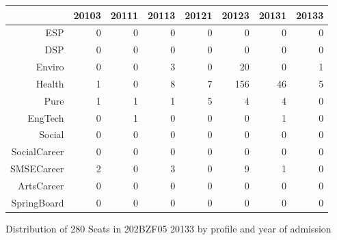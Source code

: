 \documentclass{article}\usepackage[]{graphicx}\usepackage[]{color}
\makeatletter
\newenvironment{kframe}{%
 \def\at@end@of@kframe{}%
 \ifinner\ifhmode%
  \def\at@end@of@kframe{\end{minipage}}%
  \begin{minipage}{\columnwidth}%
 \fi\fi%
 \def\FrameCommand##1{\hskip\@totalleftmargin \hskip-\fboxsep
 \colorbox{shadecolor}{##1}\hskip-\fboxsep
     \hskip-\linewidth \hskip-\@totalleftmargin \hskip\columnwidth}%
 \MakeFramed {\advance\hsize-\width
   \@totalleftmargin\z@ \linewidth\hsize
   \@setminipage}}%
 {\par\unskip\endMakeFramed%
 \at@end@of@kframe}
\makeatother
\begin{document}
\begin{figure}[H]
\centering
\begin{tabular}{rrrrrrrr}
  \hline
 & 20103 & 20111 & 20113 & 20121 & 20123 & 20131 & 20133 \\ 
  \hline
ESP &   0 &   0 &   0 &   0 &   0 &   0 &   0 \\ 
  DSP &   0 &   0 &   0 &   0 &   0 &   0 &   0 \\ 
  Enviro &   0 &   0 &   3 &   0 &  20 &   0 &   1 \\ 
  Health &   1 &   0 &   8 &   7 & 156 &  46 &   5 \\ 
  Pure &   1 &   1 &   1 &   5 &   4 &   4 &   0 \\ 
  EngTech &   0 &   1 &   0 &   0 &   0 &   1 &   0 \\ 
  Social &   0 &   0 &   0 &   0 &   0 &   0 &   0 \\ 
  SocialCareer &   0 &   0 &   0 &   0 &   0 &   0 &   0 \\ 
  SMSECareer &   2 &   0 &   3 &   0 &   9 &   1 &   0 \\ 
  ArtsCareer &   0 &   0 &   0 &   0 &   0 &   0 &   0 \\ 
  SpringBoard &   0 &   0 &   0 &   0 &   0 &   0 &   0 \\ 
   \hline
\end{tabular}
\caption{Distribution of 280 Seats in 202BZF05 20133 by profile and year of admission} 
\end{figure}
\begin{kframe}

{\ttfamily\noindent\bfseries\color{errorcolor}{\#\# Error in characters | factors: operations are possible only for numeric, logical or complex types}}\end{kframe}
\end{document}
